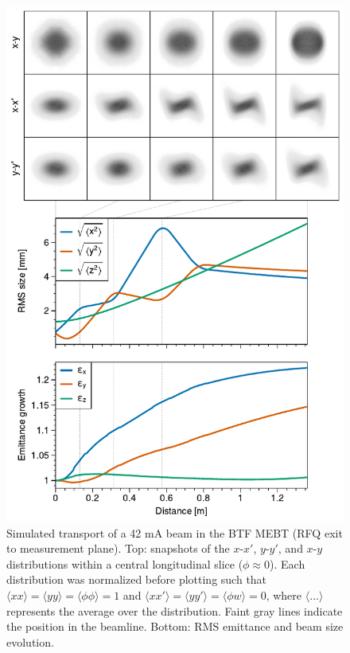 \documentclass[%
 reprint,
 amsmath,amssymb,
 aps,
prstab,
]{revtex4-2}
\begin{document}
\begin{figure}
    \centering
    \includegraphics[width=\columnwidth]{fig10.pdf}
    \caption{Simulated transport of a 42 mA beam in the BTF MEBT (RFQ exit to measurement plane). Top: snapshots of the $x$-$x'$, $y$-$y'$, and $x$-$y$ distributions within a central longitudinal slice ($\phi \approx 0$). Each distribution was normalized before plotting such that $\langle{xx}\rangle = \langle{yy}\rangle = \langle{\phi\phi}\rangle = 1$ and $\langle{xx'}\rangle = \langle{yy'}\rangle = \langle{\phi w}\rangle = 0$, where $\langle\dots\rangle$ represents the average over the distribution. Faint gray lines indicate the position in the beamline. Bottom: RMS emittance and beam size evolution.}
    \label{fig:sim}
\end{figure}
%
\end{document}
